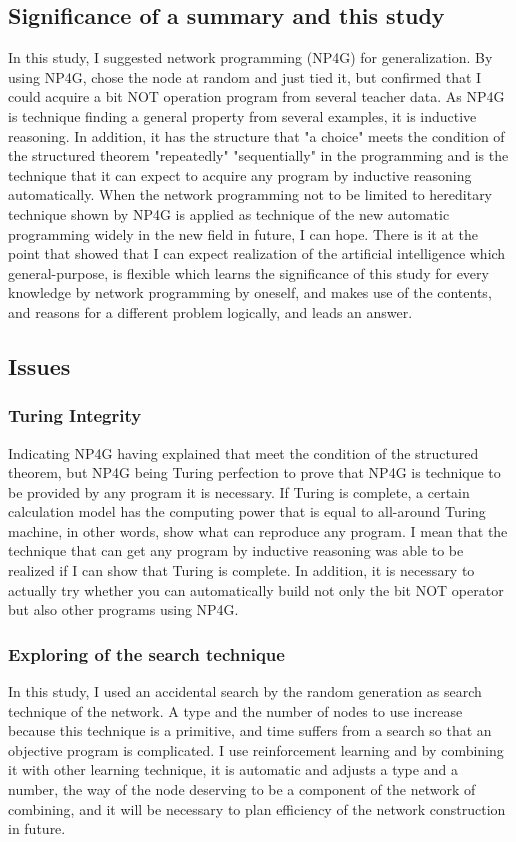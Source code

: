 \documentclass{article}
\begin{document}
\subsection {Significance of a summary and this study}
In this study, I suggested network programming (NP4G) for generalization.
By using NP4G, chose the node at random and just tied it, but confirmed that I could acquire a bit NOT operation program from several teacher data.
As NP4G is technique finding a general property from several examples, it is inductive reasoning.
In addition, it has the structure that "a choice" meets the condition of the structured theorem "repeatedly" "sequentially" in the programming and is the technique that it can expect to acquire any program by inductive reasoning automatically.
When the network programming not to be limited to hereditary technique shown by NP4G is applied as technique of the new automatic programming widely in the new field in future, I can hope.
There is it at the point that showed that I can expect realization of the artificial intelligence which general-purpose, is flexible which learns the significance of this study for every knowledge by network programming by oneself, and makes use of the contents, and reasons for a different problem logically, and leads an answer.
\subsection {Issues}
\subsubsection {Turing Integrity}
Indicating NP4G having explained that meet the condition of the structured theorem, but NP4G being Turing perfection to prove that NP4G is technique to be provided by any program it is necessary.
If Turing is complete, a certain calculation model has the computing power that is equal to all-around Turing machine, in other words, show what can reproduce any program.
I mean that the technique that can get any program by inductive reasoning was able to be realized if I can show that Turing is complete.
In addition, it is necessary to actually try whether you can automatically build not only the bit NOT operator but also other programs using NP4G.
\subsubsection {Exploring of the search technique}
In this study, I used an accidental search by the random generation as search technique of the network.
A type and the number of nodes to use increase because this technique is a primitive, and time suffers from a search so that an objective program is complicated.
I use reinforcement learning and by combining it with other learning technique, it is automatic and adjusts a type and a number, the way of the node deserving to be a component of the network of combining, and it will be necessary to plan efficiency of the network construction in future.
\end{document}
